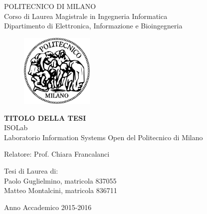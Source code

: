 \thispagestyle{empty}
\vspace*{-1.5cm} \bfseries{
\begin{center}
  \large
  POLITECNICO DI MILANO\\
  \normalsize
  Corso di Laurea Magistrale in Ingegneria Informatica\\
  Dipartimento di Elettronica, Informazione e Bioingegneria\\
  \vspace*{0.3cm} \LARGE
  \begin{figure}[htbp]
    \begin{center}
      \includegraphics[width=3.5cm]{pictures/logopm.png}
    \end{center}
  \end{figure}
  \vspace*{0.3cm} \LARGE



  \textbf{TITOLO DELLA TESI}\\



  \vspace*{.75truecm} \large
  ISOLab \\
  Laboratorio Information Systems Open del Politecnico di Milano
\end{center}
\vspace*{3.0cm} \large
\begin{flushleft}


  Relatore: Prof. Chiara Francalanci

\end{flushleft}
\vspace*{1.0cm}
\begin{flushright}


  Tesi di Laurea di:\\ Paolo Guglielmino, matricola 837055 \\ 
		       Matteo Montalcini, matricola 836711 \\


\end{flushright}
\vspace*{0.5cm}
\begin{center}



  Anno Accademico 2015-2016
\end{center} \clearpage
}
